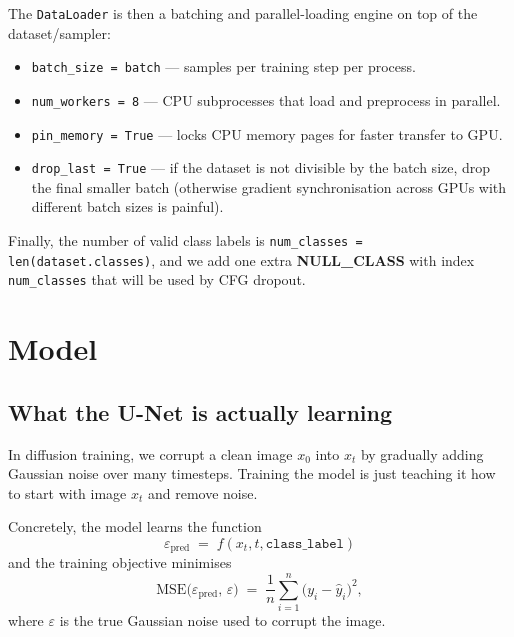 \documentclass[11pt]{article}
\newcommand{\code}[1]{\texttt{#1}}
\newcommand{\xT}{x_t}
\newcommand{\xZero}{x_0}
\newcommand{\eps}{\varepsilon}
\begin{document}
The \code{DataLoader} is then a batching and parallel-loading engine on top of
the dataset/sampler:
\begin{itemize}
  \item \code{batch\_size = batch} --- samples per training step per process.
  \item \code{num\_workers = 8} --- CPU subprocesses that load and preprocess
        in parallel.
  \item \code{pin\_memory = True} --- locks CPU memory pages for faster
        transfer to GPU.
  \item \code{drop\_last = True} --- if the dataset is not divisible by the
        batch size, drop the final smaller batch (otherwise gradient
        synchronisation across GPUs with different batch sizes is painful).
\end{itemize}

Finally, the number of valid class labels is
\code{num\_classes = len(dataset.classes)}, and we add one extra
\textbf{NULL\_CLASS} with index \code{num\_classes} that will be used by CFG
dropout.

\section{Model}

\subsection{What the U-Net is actually learning}

In diffusion training, we corrupt a clean image $\xZero$ into $\xT$ by
gradually adding Gaussian noise over many timesteps. Training the model is
just teaching it how to start with image $\xT$ and remove noise.

Concretely, the model learns the function
\[
  \eps_{\text{pred}} \;=\; f(\xT, t, \texttt{class\_label})
\]
and the training objective minimises
\[
  \mathrm{MSE}\bigl(\eps_{\text{pred}},\, \eps\bigr)
  \;=\; \frac{1}{n} \sum_{i=1}^{n} \bigl(y_i - \hat{y}_i\bigr)^2,
\]
where $\eps$ is the true Gaussian noise used to corrupt the image.

\end{document}

